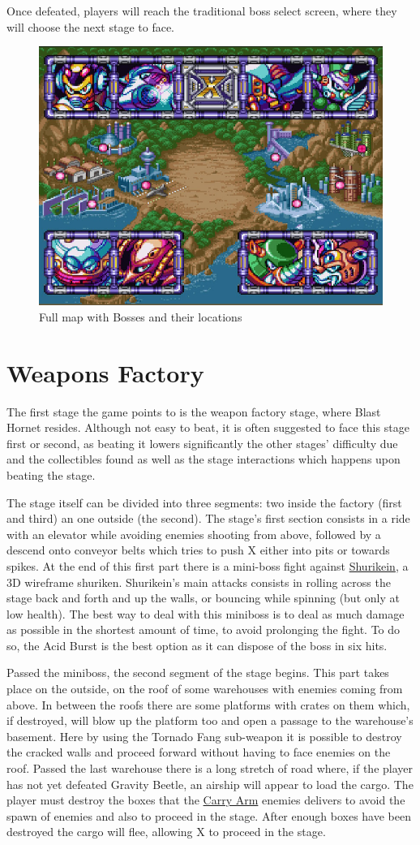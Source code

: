 Once defeated, players will reach the traditional boss select screen, where they will choose the next stage to face.
\begin{figure}[htp]
	\centering
	\includegraphics[width=0.5\linewidth]{figures/X3/Map.png}
	\caption{Full map with Bosses and their locations}
\end{figure}

\section{Weapons Factory}
The first stage the game points to is the weapon factory stage, where Blast Hornet resides. Although not easy to beat, it is often suggested to face this stage first or second, as beating it lowers significantly the other stages' difficulty due and the collectibles found as well as the  stage interactions which happens upon beating the stage.

The stage itself can be divided into three segments: two inside the factory (first and third) an one outside (the second). The stage's first section consists in a ride with an elevator while avoiding enemies shooting from above, followed by a descend onto conveyor belts which tries to push X either into pits or towards spikes. At the end of this first part there is a mini-boss fight against \hyperlink{miniboss:Shurikein}{Shurikein}, a 3D wireframe shuriken. Shurikein's main attacks consists in rolling across the stage back and forth and up the walls, or bouncing while spinning (but only at low health). The best way to deal with this miniboss is to deal as much damage as possible in the shortest amount of time, to avoid prolonging the fight. To do so, the Acid Burst is the best option as it can dispose of the boss in six hits. 

Passed the miniboss, the second segment of the stage begins. This part takes place on the outside, on the roof of some warehouses with enemies coming from above. In between the roofs there are some platforms with crates on them which, if destroyed, will blow up the platform too and open a passage to the warehouse's basement. Here by using  the Tornado Fang sub-weapon it is possible to destroy the cracked walls and proceed forward without having to face enemies on the roof. Passed the last warehouse there is a long stretch of road where, if the player has not yet defeated Gravity Beetle, an airship will appear to load the cargo. The player must destroy the boxes that the \hyperlink{enem:Carry_Arm}{Carry Arm} enemies delivers to avoid the spawn of enemies and also to proceed in the stage. After enough boxes have been destroyed the cargo will flee, allowing X to proceed in the stage.

